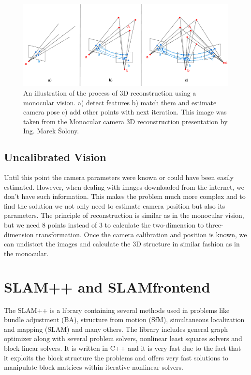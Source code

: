 \begin{figure}[ht]
	\begin{center}
		\includegraphics[keepaspectratio,width=\textwidth]{fig/mono.pdf}
	\end{center}
	\caption{An illustration of the process of 3D reconstruction using a monocular vision. a) detect features b) match them and estimate camera pose c) add other points with next iteration. This image was taken from the Monocular camera 3D reconstruction presentation by Ing. Marek Šolony.}
	\label{fig:mono}
\end{figure}

\subsection*{Uncalibrated Vision}
Until this point the camera parameters were known or could have been easily estimated. However, when dealing with images downloaded from the internet, we don't have such information. This makes the problem much more complex and to find the solution we not only need to estimate camera position but also its parameters. The principle of reconstruction is similar as in the monocular vision, but we need 8 points instead of 3 to calculate the two-dimension to three-dimension transformation. Once the camera calibration and position is known, we can undistort the images and calculate the 3D structure in similar fashion as in the monocular.

\section{SLAM++ and SLAM\textunderscore frontend}
\label{sec:slam}
The SLAM++ is a library containing several methods used in problems like bundle adjustment (BA), structure from motion (SfM), simultaneous localization and mapping (SLAM) and many others. The library includes general graph optimizer along with several problem solvers, nonlinear least squares solvers and block linear solvers.  It is written in C++ and it is very fast due to the fact that it exploits the block structure the problems and offers very fast solutions to manipulate block matrices within iterative nonlinear solvers.

